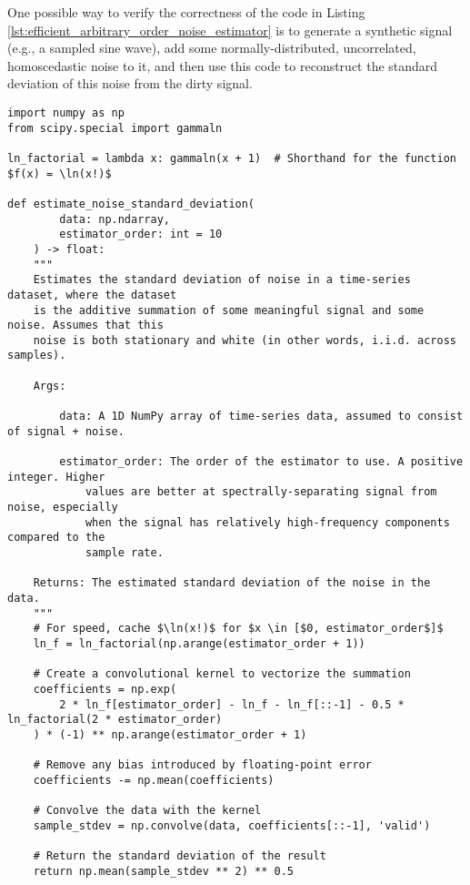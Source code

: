 One possible way to verify the correctness of the code in Listing \ref{lst:efficient_arbitrary_order_noise_estimator} is to generate a synthetic signal (e.g., a sampled sine wave), add some normally-distributed, uncorrelated, homoscedastic noise to it, and then use this code to reconstruct the standard deviation of this noise from the dirty signal.

\begin{listing}[H]
    \begin{verbatim}
import numpy as np
from scipy.special import gammaln

ln_factorial = lambda x: gammaln(x + 1)  # Shorthand for the function $f(x) = \ln(x!)$

def estimate_noise_standard_deviation(
        data: np.ndarray,
        estimator_order: int = 10
    ) -> float:
    """
    Estimates the standard deviation of noise in a time-series dataset, where the dataset
    is the additive summation of some meaningful signal and some noise. Assumes that this
    noise is both stationary and white (in other words, i.i.d. across samples).

    Args:

        data: A 1D NumPy array of time-series data, assumed to consist of signal + noise.

        estimator_order: The order of the estimator to use. A positive integer. Higher
            values are better at spectrally-separating signal from noise, especially
            when the signal has relatively high-frequency components compared to the
            sample rate.

    Returns: The estimated standard deviation of the noise in the data.
    """
    # For speed, cache $\ln(x!)$ for $x \in [$0, estimator_order$]$
    ln_f = ln_factorial(np.arange(estimator_order + 1))

    # Create a convolutional kernel to vectorize the summation
    coefficients = np.exp(
        2 * ln_f[estimator_order] - ln_f - ln_f[::-1] - 0.5 * ln_factorial(2 * estimator_order)
    ) * (-1) ** np.arange(estimator_order + 1)

    # Remove any bias introduced by floating-point error
    coefficients -= np.mean(coefficients)

    # Convolve the data with the kernel
    sample_stdev = np.convolve(data, coefficients[::-1], 'valid')

    # Return the standard deviation of the result
    return np.mean(sample_stdev ** 2) ** 0.5
    \end{verbatim}
    \caption{Example efficient implementation of the arbitrary-order noise estimator using NumPy/SciPy in Python 3.}
    \label{lst:efficient_arbitrary_order_noise_estimator}
\end{listing}
